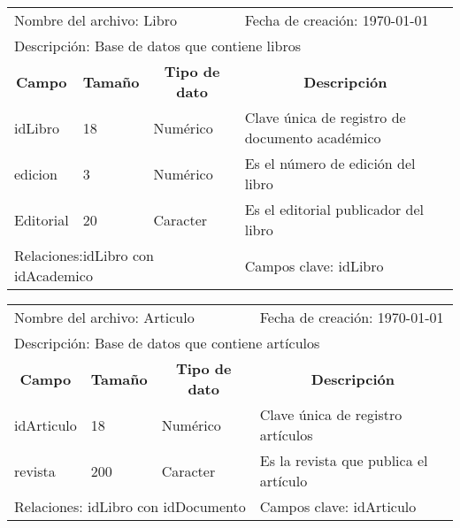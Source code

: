 \begin{table}[h]
\begin{tabular}{lllp{10cm}}
\multicolumn{3}{l}{Nombre del archivo: Libro} & \multicolumn{1}{l}{Fecha de creación: \today}\\
\multicolumn{4}{l}{Descripción: Base de datos que contiene libros} \\ \hline
\multicolumn{1}{c}{\textbf{Campo}} & \multicolumn{1}{c}{\textbf{Tamaño}} & \multicolumn{1}{c}{\textbf{Tipo de dato}} & \multicolumn{1}{c}{\textbf{Descripción}} \\ \hline

idLibro   & 18   & Numérico    & Clave única de registro de documento académico  \\
edicion    & 3  & Numérico   & Es el número de edición del libro \\
Editorial  & 20  & Caracter   & Es el editorial publicador del libro \\
\hline
\multicolumn{3}{l}{Relaciones:idLibro con idAcademico} & \multicolumn{1}{l}{Campos clave: idLibro}          
\end{tabular}
\end{table}
\begin{table}[H]
\begin{tabular}{lllp{10cm}}
\multicolumn{3}{l}{Nombre del archivo: Articulo} & \multicolumn{1}{l}{Fecha de creación: \today}\\
\multicolumn{4}{l}{Descripción: Base de datos que contiene artículos} \\ \hline
\multicolumn{1}{c}{\textbf{Campo}} & \multicolumn{1}{c}{\textbf{Tamaño}} & \multicolumn{1}{c}{\textbf{Tipo de dato}} & \multicolumn{1}{c}{\textbf{Descripción}} \\ \hline

idArticulo   & 18   & Numérico    & Clave única de registro artículos  \\
revista    & 200  & Caracter   & Es la revista que publica el artículo \\
\hline
\multicolumn{3}{l}{Relaciones: idLibro con idDocumento} & \multicolumn{1}{l}{Campos clave: idArticulo}          
\end{tabular}
\end{table}
